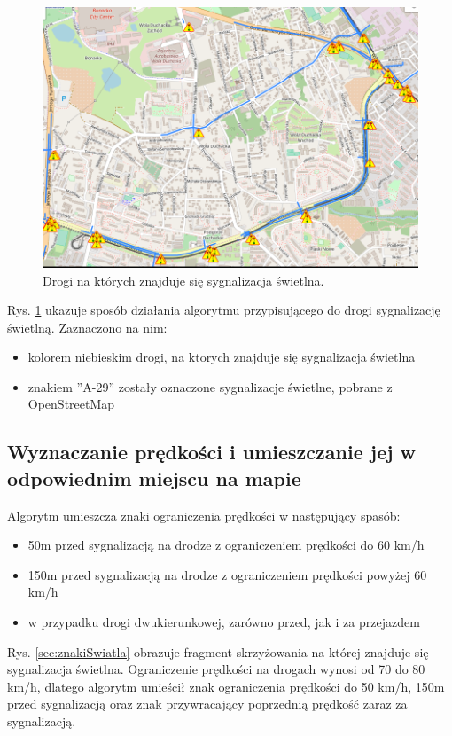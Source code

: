 \begin{figure}[h]
\caption{Drogi na których znajduje się sygnalizacja świetlna.}
\label{sec:PrzejazdyKolejowe2}
\centering
\includegraphics[width=1.1\textwidth]{traffic_sight}
\end{figure}

Rys. \ref{sec:PrzejazdyKolejowe2} ukazuje sposób działania algorytmu przypisującego do drogi sygnalizację świetlną. Zaznaczono na nim:
\begin{itemize}
\item kolorem niebieskim drogi, na ktorych znajduje się sygnalizacja świetlna
\item znakiem ''A-29'' zostały oznaczone sygnalizacje świetlne, pobrane z OpenStreetMap
\end{itemize}

\newpage
\subsection{Wyznaczanie prędkości i umieszczanie jej w odpowiednim miejscu na mapie}

Algorytm umieszcza znaki ograniczenia prędkości w następujący spasób:
\begin{itemize}
\item 50m przed sygnalizacją na drodze z ograniczeniem prędkości do 60 km/h
\item 150m przed sygnalizacją na drodze z ograniczeniem prędkości powyżej 60 km/h
\item w przypadku drogi dwukierunkowej, zarówno przed, jak i za przejazdem
\end{itemize}


Rys. \ref{sec:znakiSwiatla} obrazuje fragment skrzyżowania na której znajduje się sygnalizacja świetlna. Ograniczenie prędkości na drogach wynosi od 70 do 80 km/h, dlatego algorytm umieścił znak ograniczenia prędkości do 50 km/h, 150m przed sygnalizacją oraz znak przywracający poprzednią prędkość zaraz za sygnalizacją.

